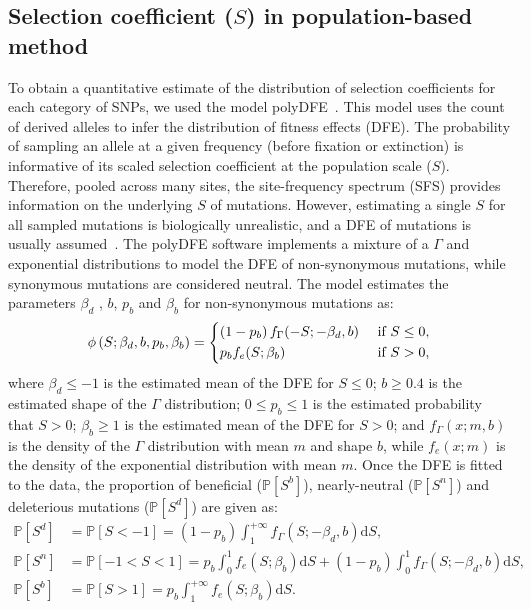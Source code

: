 \documentclass{article}
\newcommand{\der}{\text{d}}
\newcommand{\proba}{\mathbb{P}}
\newcommand{\Spop}{S}
\newcommand{\SpopDel}{\Spop^{d}}
\newcommand{\SpopNeu}{\Spop^{n}}
\newcommand{\SpopBen}{\Spop^{b}}
\newcommand{\ProbaPopDel}{\proba [ \SpopDel]}
\newcommand{\ProbaPopNeu}{\proba [ \SpopNeu ]}
\newcommand{\ProbaPopBen}{\proba [ \SpopBen ]}
\newcommand{\AdvMean}{\beta_b}
\newcommand{\DelMean}{\beta_d}
\begin{document}
    \subsection{Selection coefficient ($\Spop$) in population-based method}
    \label{subsec:s-polymorphism-method}
    To obtain a quantitative estimate of the distribution of selection coefficients for each category of SNPs, we used the model polyDFE~\cite{tataru_inference_2017, tataru_polydfe_2020}.
    This model uses the count of derived alleles to infer the distribution of fitness effects (DFE).
    The probability of sampling an allele at a given frequency (before fixation or extinction) is informative of its scaled selection coefficient at the population scale ($\Spop$).
    Therefore, pooled across many sites, the site-frequency spectrum (SFS) provides information on the underlying $\Spop$ of mutations.
    However, estimating a single $\Spop$ for all sampled mutations is biologically unrealistic, and a DFE of mutations is usually assumed~\cite{eyre-walker_distribution_2006, eyre-walker_estimating_2009}.
    The polyDFE\cite{tataru_inference_2017, tataru_polydfe_2020} software implements a mixture of a $\Gamma$ and exponential distributions to model the DFE of non-synonymous mutations, while synonymous mutations are considered neutral.
    The model estimates the parameters $\DelMean$ , $b$, $p_b$ and $\AdvMean$ for non-synonymous mutations as:
    \begin{equation}
        \phi \left( \Spop; \DelMean , b, p_b, \AdvMean \right) =
        \begin{dcases}
            \left( 1 - p_b \right) f_{\Gamma}(-\Spop; -\DelMean, b) & \text{ if $\Spop \leq 0$,} \\
            p_b f_{e}(\Spop; \AdvMean) & \text{ if $\Spop > 0$,} \\
        \end{dcases}
    \end{equation}
    where $\DelMean \leq -1 $ is the estimated mean of the DFE for $\Spop \leq 0$;
    $b \geq 0.4$ is the estimated shape of the $\Gamma$ distribution;
    $0 \leq p_b \leq 1$ is the estimated probability that $\Spop > 0$;
    $\AdvMean \geq 1$ is the estimated mean of the DFE for $\Spop > 0$;
    and $f_{\Gamma}(x; m, b)$ is the density of the $\Gamma$ distribution with mean $m$ and shape $b$, while $f_{e}(x; m)$ is the density of the exponential distribution with mean $m$.
    Once the DFE is fitted to the data, the proportion of beneficial ($\ProbaPopBen$), nearly-neutral ($\ProbaPopNeu$) and deleterious mutations ($\ProbaPopDel$) are given as:
    \begin{align}
        \ProbaPopDel &= \proba [ \Spop < -1] = \left( 1 - p_b \right) \int_{1}^{+\infty} f_{\Gamma}(\Spop; -\DelMean, b) \der \Spop, \label{eq:polyProbaDel} \\
        \ProbaPopNeu &= \proba [ -1 < \Spop < 1] = p_b \int_{0}^{1} f_{e}(\Spop; \AdvMean) \der \Spop + \left( 1 - p_b \right) \int_{0}^{1} f_{\Gamma}(\Spop; -\DelMean, b) \der \Spop, \\
        \ProbaPopBen &= \proba [ \Spop > 1] = p_b \int_{1}^{+\infty} f_{e}(\Spop; \AdvMean) \der \Spop. \label{eq:polyProbaAdv}
    \end{align}
\end{document}
